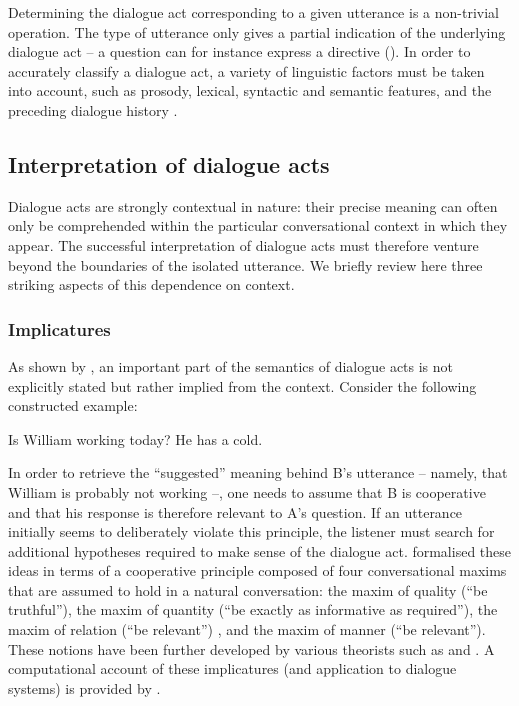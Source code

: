 Determining the dialogue act corresponding to a given utterance is a non-trivial operation. The type of utterance only gives a partial indication of the underlying dialogue act -- a question can for instance express a directive ().  In order to accurately classify a dialogue act, a variety of linguistic factors must be taken into account, such as prosody, lexical, syntactic and semantic features, and the preceding dialogue history \citep{jurafsky1998,Shriberg1998,stolcke2000,Keizer2007}.

\subsection{Interpretation of dialogue acts} 

Dialogue acts are strongly contextual in nature: their precise meaning can often only be comprehended within the particular conversational context in which they appear. The successful interpretation  of dialogue acts must therefore venture beyond the boundaries of the isolated utterance. We briefly review here three striking aspects of this dependence on context.

\subsubsection*{Implicatures}
As shown by \cite{Grice1989}, an important part of the semantics of dialogue acts is not explicitly stated but rather implied from the context.  Consider the following constructed example: 
\begin{center}
\begin{dialogue}
 Is William working today?
 He has a cold.
\end{dialogue}
\end{center}
In order to retrieve the ``suggested'' meaning behind B's utterance -- namely, that William is probably not working --, one needs to assume that B is cooperative and that his response is therefore relevant to A's question.  If an utterance initially seems to deliberately violate this principle, the listener must search for additional hypotheses required to make sense of the dialogue act. \cite{Grice1989} formalised these ideas in terms of a cooperative principle composed of four conversational maxims that are assumed to hold in a natural conversation: the maxim of quality (``be truthful''), the maxim of quantity (``be exactly as informative as required''), the maxim of relation (``be relevant'') , and the maxim of manner (``be relevant'').  These notions have been further developed by various theorists such as \cite{wilson2002relevance} and \cite{horn2008handbook}.  A computational account of these implicatures (and application to dialogue systems) is provided by \cite{benotti2010implicature}. 


